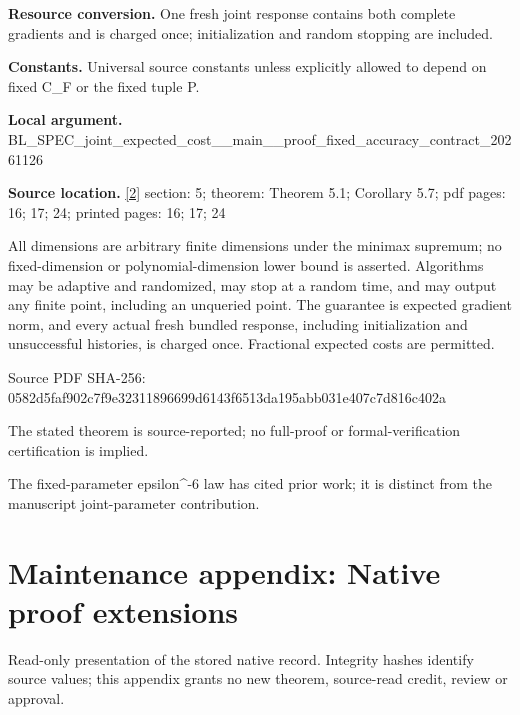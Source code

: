 \documentclass[10pt,a4paper]{article}
\begin{document}
\textbf{Resource conversion.} One fresh joint response contains both complete gradients and is charged once; initialization and random stopping are included.



\textbf{Constants.} Universal source constants unless explicitly allowed to depend on fixed C\_F or the fixed tuple P.



\textbf{Local argument.} BL\_SPEC\_joint\_expected\_c\allowbreak{}ost\_\_main\_\_proof\_fixed\_a\allowbreak{}ccuracy\_contract\_2026112\allowbreak{}6



\textbf{Source location.} \href{https://github.com/WU-Wendao/Colombo/blob/main/colombo_sensorium/Complexity_altas/data/sources/colombo/SFO_JOINT_20261126/manuscript.pdf}{[2]} section: 5; theorem: Theorem 5.1; Corollary 5.7; pdf pages: 16; 17; 24; printed pages: 16; 17; 24



All dimensions are arbitrary finite dimensions under the minimax supremum; no fixed-dimension or polynomial-dimension lower bound is asserted. Algorithms may be adaptive and randomized, may stop at a random time, and may output any finite point, including an unqueried point. The guarantee is expected gradient norm, and every actual fresh bundled response, including initialization and unsuccessful histories, is charged once. Fractional expected costs are permitted.



Source PDF SHA-256: 0582d5faf902c7f9e3231189\allowbreak{}6699d6143f6513da195abb03\allowbreak{}1e407c7d816c402a



The stated theorem is source-reported; no full-proof or formal-verification certification is implied.



The fixed-parameter epsilon\textasciicircum{}-6 law has cited prior work; it is distinct from the manuscript joint-parameter contribution.



\section{Maintenance appendix: Native proof extensions}


Read-only presentation of the stored native record. Integrity hashes identify source values; this appendix grants no new theorem, source-read credit, review or approval.
\end{document}
